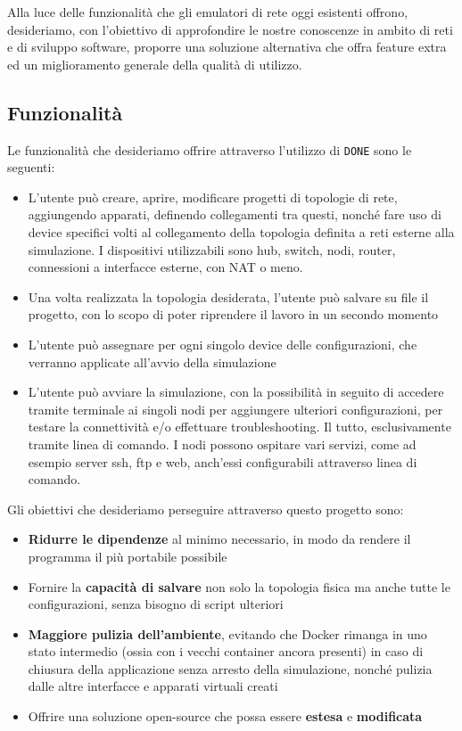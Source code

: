 Alla luce delle funzionalità che gli emulatori di rete oggi esistenti offrono, desideriamo, con l'obiettivo di approfondire le nostre conoscenze in ambito di reti e di sviluppo software, proporre una soluzione alternativa che offra feature extra ed un miglioramento generale della qualità di utilizzo.
\subsection{Funzionalità}
Le funzionalità che desideriamo offrire attraverso l'utilizzo di \texttt{DONE} sono le seguenti: 
\begin{itemize}
    \item L'utente può creare, aprire, modificare progetti di topologie di rete, aggiungendo apparati, definendo collegamenti tra questi, nonché fare uso di device specifici volti al collegamento della topologia definita a reti esterne alla simulazione. I dispositivi utilizzabili sono hub, switch, nodi, router, connessioni a interfacce esterne, con NAT o meno.
    \item Una volta realizzata la topologia desiderata, l'utente può salvare su file il progetto, con lo scopo di poter riprendere il lavoro in un secondo momento
    \item L'utente può assegnare per ogni singolo device delle configurazioni, che verranno applicate all'avvio della simulazione
    \item L'utente può avviare la simulazione, con la possibilità in seguito di accedere tramite terminale ai singoli nodi per aggiungere ulteriori configurazioni, per testare la connettività e/o effettuare troubleshooting. Il tutto, esclusivamente tramite linea di comando. I nodi possono ospitare vari servizi, come ad esempio server ssh, ftp e web, anch'essi configurabili attraverso linea di comando. 
\end{itemize}
Gli obiettivi che desideriamo perseguire attraverso questo progetto sono:
\begin{itemize}
    \item \textbf{Ridurre le dipendenze} al minimo necessario, in modo da rendere il programma il più portabile possibile
    \item Fornire la \textbf{capacità di salvare} non solo la topologia fisica ma anche tutte le configurazioni, senza bisogno di script ulteriori
    \item \textbf{Maggiore pulizia dell'ambiente}, evitando che Docker rimanga in uno stato intermedio (ossia con i vecchi container ancora presenti) in caso di chiusura della applicazione senza arresto della simulazione, nonché pulizia dalle altre interfacce e apparati virtuali creati
    \item Offrire una soluzione open-source che possa essere \textbf{estesa} e \textbf{modificata}
\end{itemize}
